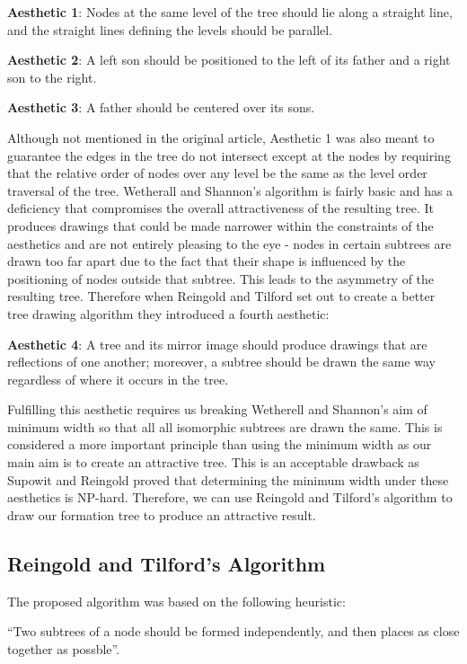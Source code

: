 \documentclass{report}
\begin{document}
\textbf{Aesthetic 1}: Nodes at the same level of the tree should lie along a straight line, and the straight lines defining the levels should be parallel. 

\textbf{Aesthetic 2}: A left son should be positioned to the left of its father and a right son to the right.

\textbf{Aesthetic 3}: A father should be centered over its sons.

Although not mentioned in the original article, Aesthetic 1 was also meant to guarantee the edges in the tree do not intersect except at the nodes by requiring that the relative order of nodes over any level be the same as the level order traversal of the tree. Wetherall and Shannon's algorithm is fairly basic and has a deficiency that compromises the overall attractiveness of the resulting tree. It produces drawings that could be made narrower within the constraints of the aesthetics and are not entirely pleasing to the eye - nodes in certain subtrees are drawn too far apart due to the fact that their shape is influenced by the positioning of nodes outside that subtree. This leads to the asymmetry of the resulting tree. Therefore when Reingold and Tilford\cite{tidierdrawingsrt} set out to create a better tree drawing algorithm they introduced a fourth aesthetic:

\textbf{Aesthetic 4}: A tree and its mirror image should produce drawings that are reflections of one another; moreover, a subtree should be drawn the same way regardless of where it occurs in the tree.

Fulfilling this aesthetic requires us breaking Wetherell and Shannon's aim of minimum width so that all all isomorphic subtrees are drawn the same. This is considered a more important principle than using the minimum width as our main aim is to create an attractive tree. This is an acceptable drawback as Supowit and Reingold proved that determining the minimum width under these aesthetics is NP-hard\cite{complexityofdrawingtreesnicely}. Therefore, we can use Reingold and Tilford's algorithm to draw our formation tree to produce an attractive result. 

\subsection{Reingold and Tilford's Algorithm}

The proposed algorithm was based on the following heuristic: 

``Two subtrees of a node should be formed independently, and then places as close together as possble''\cite{tidierdrawingsws}.
\end{document}
